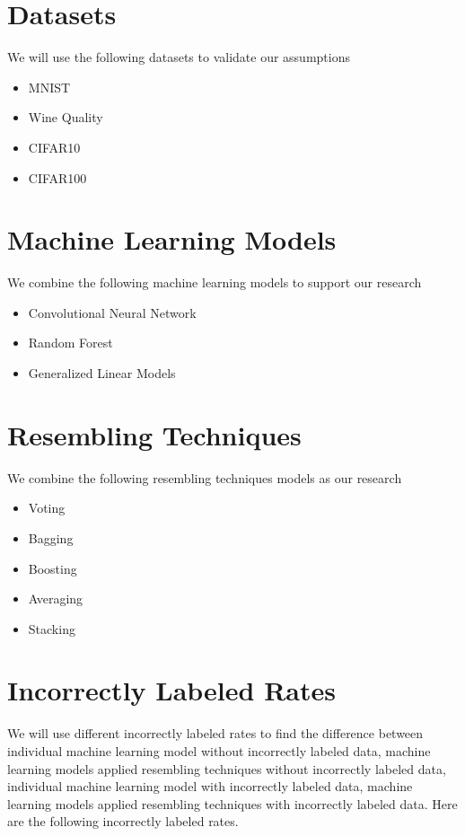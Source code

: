 \documentclass{article}
\begin{document}
\section{Datasets}

We will use the following datasets to validate our assumptions

\begin{itemize}
    \item MNIST
    \item Wine Quality
    \item CIFAR10
    \item CIFAR100
\end{itemize}

\section{Machine Learning Models}

We combine the following machine learning models to support our research


\begin{itemize}
    \item Convolutional Neural Network
    \item Random Forest
    \item Generalized Linear Models 
\end{itemize}


\section{Resembling Techniques}

We combine the following resembling techniques models as our research


\begin{itemize}
    \item Voting
    \item Bagging
    \item Boosting
    \item Averaging
    \item Stacking
\end{itemize}

\section{Incorrectly Labeled Rates}

We will use different incorrectly labeled rates to find the difference between individual machine learning model without incorrectly labeled data, machine learning models applied resembling techniques without incorrectly labeled data, individual machine learning model with incorrectly labeled data, machine learning models applied resembling techniques with incorrectly labeled data. Here are the following incorrectly labeled rates. 
\end{document}
